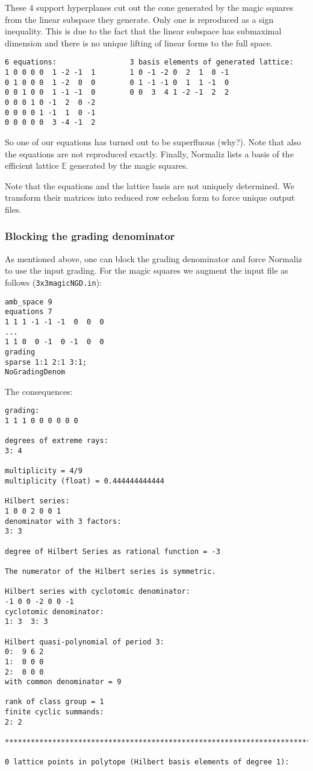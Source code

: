 \documentclass[12pt,a4paper]{scrartcl}
\theoremstyle{definition}
\def\EE{{\mathbb E}}
\begin{document}
These $4$ support hyperplanes cut out the cone generated by the magic squares from the linear subspace they generate. Only one is reproduced as a sign inequality. This is due to the fact that the linear subspace has submaximal dimension and there is no unique lifting of linear forms to the full space.
\begin{Verbatim}
6 equations:                 3 basis elements of generated lattice:
1 0 0 0 0  1 -2 -1  1        1 0 -1 -2 0  2  1  0 -1
0 1 0 0 0  1 -2  0  0        0 1 -1 -1 0  1  1 -1  0
0 0 1 0 0  1 -1 -1  0        0 0  3  4 1 -2 -1  2  2
0 0 0 1 0 -1  2  0 -2
0 0 0 0 1 -1  1  0 -1
0 0 0 0 0  3 -4 -1  2
\end{Verbatim}
So one of our equations has turned out to be superfluous (why?). Note that also the equations are not reproduced exactly. Finally, Normaliz lists a basis of the efficient lattice $\EE$  generated by the magic squares. 

Note that the equations and the lattice basis are not uniquely determined. We transform their matrices into reduced row echelon form to force unique output files.

\subsubsection{Blocking the grading denominator}\label{NoGradingDenominator}

As mentioned above, one can block the grading denominator and force Normaliz to use the input grading. For the magic squares we augment the input file as follows (\verb|3x3magicNGD.in|):
\begin{Verbatim}
amb_space 9
equations 7
1 1 1 -1 -1 -1  0  0  0
...
1 1 0  0 -1  0 -1  0  0
grading
sparse 1:1 2:1 3:1;
NoGradingDenom
\end{Verbatim}
The consequences:
\begin{Verbatim}
grading:
1 1 1 0 0 0 0 0 0 

degrees of extreme rays:
3: 4  

multiplicity = 4/9
multiplicity (float) = 0.444444444444

Hilbert series:
1 0 0 2 0 0 1 
denominator with 3 factors:
3: 3  

degree of Hilbert Series as rational function = -3

The numerator of the Hilbert series is symmetric.

Hilbert series with cyclotomic denominator:
-1 0 0 -2 0 0 -1 
cyclotomic denominator:
1: 3  3: 3  

Hilbert quasi-polynomial of period 3:
0:  9 6 2
1:  0 0 0
2:  0 0 0
with common denominator = 9

rank of class group = 1
finite cyclic summands:
2: 2  

***********************************************************************

0 lattice points in polytope (Hilbert basis elements of degree 1):
\end{Verbatim}
\end{document}
